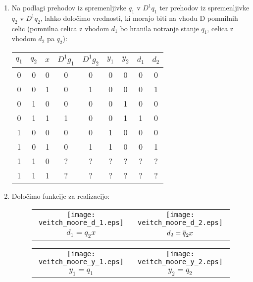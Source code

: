 \begin{resitev}
\begin{enumerate}
\bigskip

\item Na podlagi prehodov iz spremenljivke $q_1$ v $D^1q_1$ ter prehodov iz spremenljivke $q_2$ v $D^1q_2$, lahko določimo vrednosti, ki morajo biti na vhodu D pomnilnih celic (pomnilna celica z vhodom $d_1$ bo hranila notranje stanje $q_1$, celica z vhodom $d_2$ pa $q_2$):

\begin{center}
\begin{tabular}{ccc|cccc|cc}
$q_1$ & $q_2$ & $x$ & $D^1 g_1$ & $D^1 g_2$ & $y_1$ & $y_2$ & $d_1$ & $d_2$\\
\hline
0 & 0 & 0 & 0 & 0 & 0 & 0 & 0 & 0\\
0 & 0 & 1 & 0 & 1 & 0 & 0 & 0 & 1\\
0 & 1 & 0 & 0 & 0 & 0 & 1 & 0 & 0\\
0 & 1 & 1 & 1 & 0 & 0 & 1 & 1 & 0\\
1 & 0 & 0 & 0 & 0 & 1 & 0 & 0 & 0\\
1 & 0 & 1 & 0 & 1 & 1 & 0 & 0 & 1\\
1 & 1 & 0 & ? & ? & ? & ? & ? & ?\\
1 & 1 & 1 & ? & ? & ? & ? & ? & ?\\
\end{tabular}
\end{center}

\bigskip

\item Določimo funkcije za realizacijo:


\begin{figure}[!ht]
\begin{center}
\begin{tabular}{cc}
\texttt{[image: veitch\_moore\_d\_1.eps]} &
\texttt{[image: veitch\_moore\_d\_2.eps]} \\
$d_1 = q_2 x$ & $d_2 = \overline q_2 x$\\
\end{tabular}
\end{center}
\end{figure}

\begin{figure}[!ht]
\begin{center}
\begin{tabular}{cc}
\texttt{[image: veitch\_moore\_y\_1.eps]} &
\texttt{[image: veitch\_moore\_y\_2.eps]} \\
$y_1 = q_1$ & $y_2 = q_2$\\
\end{tabular}
\end{center}
\end{figure}


\end{enumerate}
\end{resitev}
